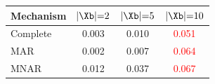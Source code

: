 \begin{tabular}{lccc}
    \toprule
    Mechanism & $|\Xb|{=}2$ & $|\Xb|{=}5$ & $|\Xb|{=}10$ \\
    \midrule
    Complete  & 0.003 & 0.010 & \textcolor{red}{0.051} \\
    MAR       & 0.002 & 0.007 & \textcolor{red}{0.064} \\
    MNAR      & 0.012 & 0.037 & \textcolor{red}{0.067} \\
    \bottomrule
\end{tabular}
